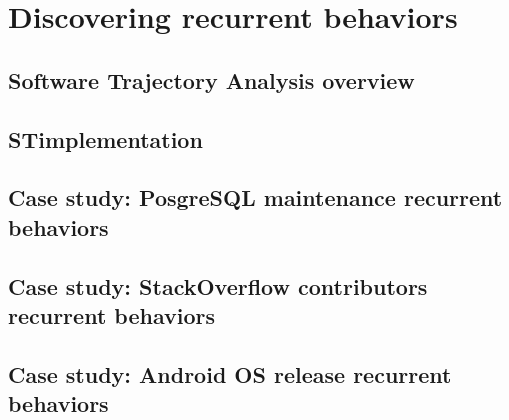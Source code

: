 \chapter{Discovering recurrent behaviors}\label{chapter_sta}
\section{Software Trajectory Analysis overview}
\section{STimplementation}
\section{Case study: PosgreSQL maintenance recurrent behaviors}
\section{Case study: StackOverflow contributors recurrent behaviors}
\section{Case study: Android OS release recurrent behaviors}
